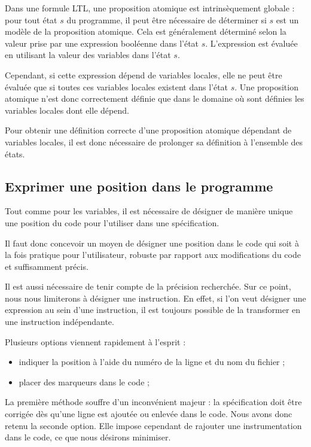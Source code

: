 Dans une formule LTL, une proposition atomique est intrinsèquement globale :
pour tout état \(s\) du programme, il peut être nécessaire de déterminer si
\(s\) est un modèle de la proposition atomique. Cela est généralement déterminé
selon la valeur prise par une expression booléenne dans l'état \(s\).
L'expression est évaluée en utilisant la valeur des variables dans l'état \(s\).

Cependant, si cette expression dépend de variables locales, elle ne peut être
évaluée que si toutes ces variables locales existent dans l'état \(s\). Une
proposition atomique n'est donc correctement définie que dans le domaine où sont
définies les variables locales dont elle dépend.

Pour obtenir une définition correcte d'une proposition atomique dépendant de
variables locales, il est donc nécessaire de prolonger sa définition à
l'ensemble des états.

\subsection{Exprimer une position dans le programme}

Tout comme pour les variables, il est nécessaire de désigner de manière unique
une position du code pour l'utiliser dans une spécification.

Il faut donc concevoir un moyen de désigner une position dans le code qui soit
à la fois pratique pour l'utilisateur, robuste par rapport aux modifications du
code et suffisamment précis.

Il est aussi nécessaire de tenir compte de la précision recherchée. Sur ce
point, nous nous limiterons à désigner une instruction. En effet, si l'on veut
désigner une expression au sein d'une instruction, il est toujours possible de
la transformer en une instruction indépendante.

Plusieurs options viennent rapidement à l'esprit :

\begin{itemize}
\item
  indiquer la position à l'aide du numéro de la ligne et du nom du fichier ;
\item
  placer des marqueurs dans le code ;
\end{itemize}

La première méthode souffre d'un inconvénient majeur : la spécification doit
être corrigée dès qu'une ligne est ajoutée ou enlevée dans le code. Nous avons
donc retenu la seconde option. Elle impose cependant de rajouter une
instrumentation dans le code, ce que nous désirons minimiser.

